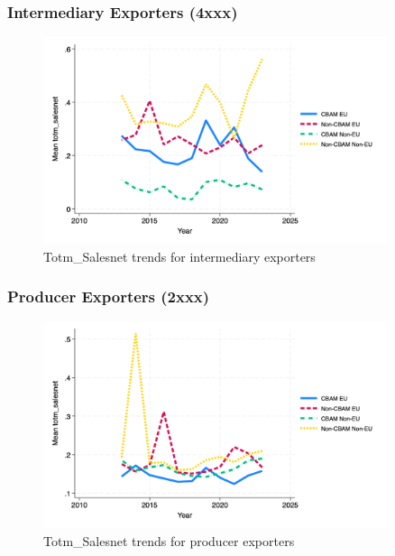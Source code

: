 \documentclass{article}
\begin{document}
\subsubsection{Intermediary Exporters (4xxx)}
\begin{figure}[h!]
\centering
\includegraphics[width=0.9\textwidth]{totm_salesnet_ei.png}
\caption{Totm_Salesnet trends for intermediary exporters}
\label{fig:totm_salesnet_ei}
\end{figure}

\subsubsection{Producer Exporters (2xxx)}
\begin{figure}[h!]
\centering
\includegraphics[width=0.9\textwidth]{totm_salesnet_ep.png}
\caption{Totm_Salesnet trends for producer exporters}
\label{fig:totm_salesnet_ep}
\end{figure}
\end{document}
